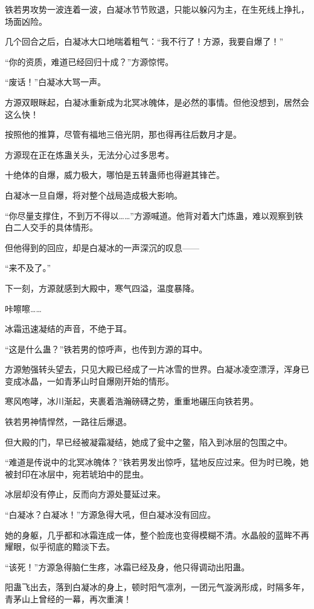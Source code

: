 \begin{this_body}
铁若男攻势一波连着一波，白凝冰节节败退，只能以躲闪为主，在生死线上挣扎，场面凶险。

几个回合之后，白凝冰大口地喘着粗气：“我不行了！方源，我要自爆了！”

“你的资质，难道已经回归十成？”方源惊愕。

“废话！”白凝冰大骂一声。

方源双眼眯起，白凝冰重新成为北冥冰魄体，是必然的事情。但他没想到，居然会这么快！

按照他的推算，尽管有福地三倍光阴，那也得再往后数月才是。

方源现在正在炼蛊关头，无法分心过多思考。

十绝体的自爆，威力极大，哪怕是五转蛊师也得避其锋芒。

白凝冰一旦自爆，将对整个战局造成极大影响。

“你尽量支撑住，不到万不得以……”方源喊道。他背对着大门炼蛊，难以观察到铁白二人交手的具体情形。

但他得到的回应，却是白凝冰的一声深沉的叹息——

“来不及了。”

下一刻，方源就感到大殿中，寒气四溢，温度暴降。

咔嚓嚓……

冰霜迅速凝结的声音，不绝于耳。

“这是什么蛊？”铁若男的惊呼声，也传到方源的耳中。

方源勉强转头望去，只见大殿已经成了一片冰雪的世界。白凝冰凌空漂浮，浑身已变成冰晶，一如青茅山时自爆刚开始的情形。

寒风咆哮，冰川渐起，夹裹着浩瀚磅礴之势，重重地碾压向铁若男。

铁若男神情悍然，一路往后爆退。

但大殿的门，早已经被凝霜凝结，她成了瓮中之鳖，陷入到冰层的包围之中。

“难道是传说中的北冥冰魄体？”铁若男发出惊呼，猛地反应过来。但为时已晚，她被封印在冰层中，宛若琥珀中的昆虫。

冰层却没有停止，反而向方源处蔓延过来。

“白凝冰？白凝冰！”方源急得大吼，但白凝冰没有回应。

她的身躯，几乎都和冰霜连成一体，整个脸庞也变得模糊不清。水晶般的蓝眸不再耀眼，似乎彻底的黯淡下去。

“该死！”方源急得脑仁生疼，冰霜已经及身，他只得调动出阳蛊。

阳蛊飞出去，落到白凝冰的身上，顿时阳气凛冽，一团元气漩涡形成，时隔多年，青茅山上曾经的一幕，再次重演！


\end{this_body}
